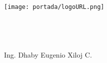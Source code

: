 %
\begin{titlepage}

\vspace*{\fill}
\begin{center}
\texttt{[image: portada/logoURL.png]}~
\\[1cm]
\\
\\
\\[1cm]
\text{\large \nCurso} \\
Ing. Dhaby Eugenio Xiloj C.
\\[2cm]
\HBar \\[0.5cm]
\text{\LARGE\cTituloA}
\\[1cm]
\text{\LARGE\cTituloB} \\[0.5cm]
\HBar \\[3cm]

\cFecha
\end{center}
\vspace*{\fill}
\end{titlepage}
